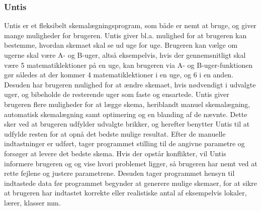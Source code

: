 \subsubsection{Untis}
Untis er et fleksibelt skemalægningsprogram, som både er nemt at bruge, og giver mange muligheder for brugeren. Untis giver bl.a. mulighed for at brugeren kan bestemme, hvordan skemaet skal se ud uge for uge. Brugeren kan vælge om ugerne skal være A- og B-uger, altså eksempelvis, hvis der gennemsnitligt skal være 5 matematiklektioner på en uge, kan brugeren via A- og B-uger-funktionen gør således at der kommer 4 matematiklektioner i en uge, og 6 i en anden. Desuden har brugeren mulighed for at ændre skemaet, hvis nødvendigt i udvalgte uger, og bibeholde de resterende uger som faste og ensartede. 
Untis giver brugeren flere muligheder for at lægge skema, heriblandt manuel skemalægning, automatisk skemalægning samt optimering og en blanding af de nævnte. Dette sker ved at brugeren udfylder udvalgte brikker, og herefter benytter Untis til at udfylde resten for at opnå det bedste mulige resultat. Efter de manuelle indtastninger er udført, tager programmet stilling til de angivne parametre og forsøger at levere det bedste skema. Hvis der opstår konflikter, vil Untis informere brugeren og og vise hvori problemet ligger, så brugeren har nemt ved at rette fejlene og justere parametrene. Desuden tager programmet hensyn til indtastede data før programmet begynder at generere mulige skemaer, for at sikre at brugeren har indtastet korrekte eller realistiske antal af eksempelvis lokaler, lærer, klasser mm\cite{biblop1:18}.
